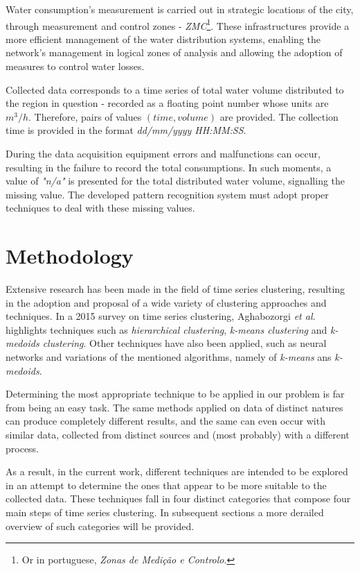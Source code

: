 \documentclass[9pt,journal,compsoc]{IEEEtran}
\begin{document}
Water consumption's measurement is carried out in strategic locations of the city, through measurement and control zones - \emph{ZMC}\footnote{Or in portuguese, \emph{Zonas de Medição e Controlo}.}. These infrastructures provide a more efficient management of the water distribution systems, enabling the network's management in logical zones of analysis and allowing the adoption of measures to control water losses.

Collected data corresponds to a time series of total water volume distributed to the region in question - recorded as a floating point number whose units are $m^{3}/h$. Therefore, pairs of values $(time, volume)$ are provided. The collection time is provided in the format \emph{dd/mm/yyyy HH:MM:SS}.

During the data acquisition equipment errors and malfunctions can occur, resulting in the failure to record the total consumptions. In such moments, a value of \emph{"n/a"} is presented for the total distributed water volume, signalling the missing value. The developed pattern recognition system must adopt proper techniques to deal with these missing values.

\section{Methodology}
\label{methodology}

Extensive research has been made in the field of time series clustering, resulting in the adoption and proposal of a wide variety of clustering approaches and techniques. In a 2015 survey on time series clustering, Aghabozorgi \emph{et al.} \cite{aghabozorgi2015time} highlights techniques such as \emph{hierarchical clustering}, \emph{k-means clustering} and \emph{k-medoids clustering}. Other techniques have also been applied, such as neural networks and variations of the mentioned algorithms, namely of \emph{k-means} ans \emph{k-medoids}.

Determining the most appropriate technique to be applied in our problem is far from being an easy task. The same methods applied on data of distinct natures can produce completely different results, and the same can even occur with similar data, collected from distinct sources and (most probably) with a different process.

As a result, in the current work, different techniques are intended to be explored in an attempt to determine the ones that appear to be more suitable to the collected data. These techniques fall in four distinct categories that compose four main steps of time series clustering. In subsequent sections a more derailed overview of such categories will be provided.
\end{document}

